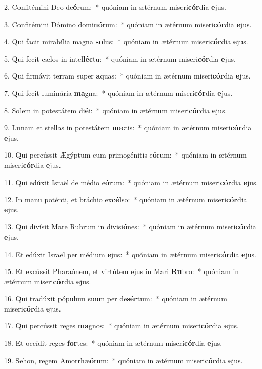 2. Confitémini Deo de\textbf{ó}rum:~*  quóniam in ætérnum miseri\textbf{cór}dia \textbf{e}jus.\

3. Confitémini Dómino domi\textbf{nó}rum:~*  quóniam in ætérnum miseri\textbf{cór}dia \textbf{e}jus.\

4. Qui facit mirabília magna \textbf{so}lus:~*  quóniam in ætérnum miseri\textbf{cór}dia \textbf{e}jus.\

5. Qui fecit cælos in intel\textbf{léc}tu:~*  quóniam in ætérnum miseri\textbf{cór}dia \textbf{e}jus.\

6. Qui firmávit terram super \textbf{a}quas:~*  quóniam in ætérnum miseri\textbf{cór}dia \textbf{e}jus.\

7. Qui fecit luminária \textbf{ma}gna:~*  quóniam in ætérnum miseri\textbf{cór}dia \textbf{e}jus.\

8. Solem in potestátem di\textbf{é}i:~*  quóniam in ætérnum miseri\textbf{cór}dia \textbf{e}jus.\

9. Lunam et stellas in potestátem \textbf{noc}tis:~*  quóniam in ætérnum miseri\textbf{cór}dia \textbf{e}jus.\

10. Qui percússit Ægýptum cum primogénitis e\textbf{ó}rum:~*  quóniam in ætérnum miseri\textbf{cór}dia \textbf{e}jus.\

11. Qui edúxit Israël de médio e\textbf{ó}rum:~*  quóniam in ætérnum miseri\textbf{cór}dia \textbf{e}jus.\

12. In manu poténti, et bráchio ex\textbf{cél}so:~*  quóniam in ætérnum miseri\textbf{cór}dia \textbf{e}jus.\

13. Qui divísit Mare Rubrum in divisi\textbf{ó}nes:~*  quóniam in ætérnum miseri\textbf{cór}dia \textbf{e}jus.\

14. Et edúxit Israël per médium \textbf{e}jus:~*  quóniam in ætérnum miseri\textbf{cór}dia \textbf{e}jus.\

15. Et excússit Pharaónem, et virtútem ejus in Mari \textbf{Ru}bro:~*  quóniam in ætérnum miseri\textbf{cór}dia \textbf{e}jus.\

16. Qui tradúxit pópulum suum per de\textbf{sér}tum:~*  quóniam in ætérnum miseri\textbf{cór}dia \textbf{e}jus.\

17. Qui percússit reges \textbf{ma}gnos:~*  quóniam in ætérnum miseri\textbf{cór}dia \textbf{e}jus.\

18. Et occídit reges \textbf{for}tes:~*  quóniam in ætérnum miseri\textbf{cór}dia \textbf{e}jus.\

19. Sehon, regem Amorrhæ\textbf{ó}rum:~*  quóniam in ætérnum miseri\textbf{cór}dia \textbf{e}jus.\

